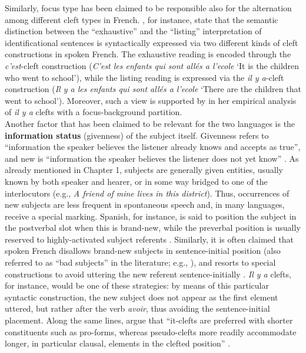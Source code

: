 Similarly, focus type has been claimed to be responsible also for the alternation among different cleft types in French. \textcite{de2015status}, for instance, state that the semantic distinction between the ``exhaustive” and the ``listing” interpretation of identificational sentences is syntactically expressed via two different kinds of cleft constructions in spoken French. The exhaustive reading is encoded through the \textit{c’est}-cleft construction (\textit{C’est les enfants qui sont allés a l’ecole} `It is the children who went to school'), while the listing reading is expressed via the \textit{il y a}-cleft construction (\textit{Il y a les enfants qui sont allés a l’ecole} `There  are  the  children  that went to school'). Moreover, such a view is supported by \textcite{karssenberg2017oiseaux} in her empirical analysis of \textit{il y a} clefts with a focus-background partition.\\
Another factor that has been claimed to be relevant for the two languages is the \textbf{information status} (givenness) \parencite{firbas1966non, chafe1970meaning, prince1992zpg} of the subject itself. Givenness refers to “information the speaker believes the listener already knows and accepts as true”, and new is “information the speaker believes the listener does not yet know” \parencite[3]{clark1977}. As already mentioned in Chapter 1, subjects are generally given entities, usually known by both speaker and hearer, or in some way bridged to one of the interlocutors (e.g., \textit{A friend of mine lives in this district}). Thus, occurrences of new subjects are less frequent in spontaneous speech and, in many languages, receive a special marking. Spanish, for instance, is said to position the subject in the postverbal slot when this is brand-new, while the preverbal position is usually reserved to highly-activated subject referents \parencite{gutierrez2013structural}. Similarly, it is often claimed that spoken French disallows brand-new subjects  in sentence-initial position (also referred to as ``bad subjects” in the literature; e.g., \cite{beaver2005bad, karssenberg20186}), and resorts to special constructions to avoid uttering the new referent sentence-initially \parencite{lambrecht2010constraints}. \textit{Il y a} clefts, for instance, would be one of these strategies: by means of this particular syntactic construction, the new subject does not appear as the first element uttered, but rather after the verb \textit{avoir}, thus avoiding the sentence-initial placement.  Along the same lines, \textcite{dufter201614} argue that ``it-clefts are preferred with shorter constituents such as pro-forms,  whereas pseudo-clefts more readily accommodate longer,  in particular clausal, elements in the clefted position” \parencite[24]{dufter201614}.\\
